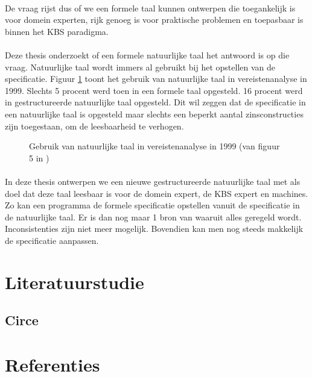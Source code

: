 \documentclass[]{article}
\begin{document}
\paragraph{} De vraag rijst dus of we een formele taal kunnen ontwerpen die toegankelijk is
voor domein experten, rijk genoeg is voor praktische problemen en toepasbaar is
binnen het KBS paradigma.

\paragraph{} Deze thesis onderzoekt of een formele natuurlijke taal het antwoord is op die
vraag. Natuurlijke taal wordt immers al gebruikt bij het opstellen van de
specificatie. Figuur \ref{fig:natural-language-use} toont het gebruik van
natuurlijke taal in vereistenanalyse in 1999. Slechts 5 procent werd toen in een
formele taal opgesteld. 16 procent werd in gestructureerde natuurlijke taal
opgesteld. Dit wil zeggen dat de specificatie in een natuurlijke taal is
opgesteld maar slechts een beperkt aantal zinsconstructies zijn toegestaan, om
de leesbaarheid te verhogen.

\begin{figure}
  \label{fig:natural-language-use}
  \caption{Gebruik van natuurlijke taal in vereistenanalyse in 1999 (van figuur 5 in \cite{Luisa2004})}
\end{figure}

\paragraph{} In deze thesis ontwerpen we een nieuwe gestructureerde natuurlijke taal
met als doel dat deze taal leesbaar is voor de domein expert, de KBS expert en
machines. Zo kan een programma de formele specificatie opstellen vanuit de
specificatie in de natuurlijke taal. Er is dan nog maar 1 bron van waaruit alles
geregeld wordt. Inconsistenties zijn niet meer mogelijk. Bovendien kan men nog
steeds makkelijk de specificatie aanpassen.

\section{Literatuurstudie}
\subsection{Circe \cite{Ambriola1997}}
			
\section{Referenties}


\end{document}
